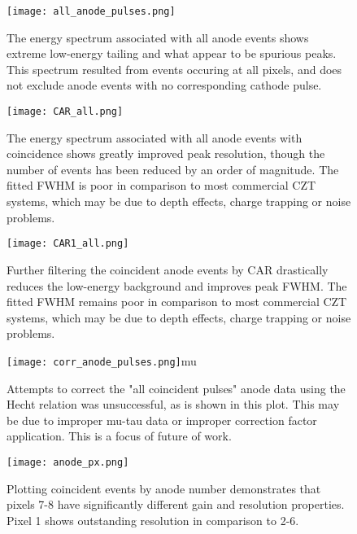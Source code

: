 \begin{figure}[h!]
\begin{center}
\texttt{[image: all\_anode\_pulses.png]}
\caption{The energy spectrum associated with all anode events shows extreme low-energy tailing and what appear to be spurious peaks. This spectrum resulted from events occuring at all pixels, and does not exclude anode events with no corresponding cathode pulse. }
\label{400}
\end{center}
\end{figure}


\begin{figure}[h!]
\begin{center}
\texttt{[image: CAR\_all.png]}
\caption{The energy spectrum associated with all anode events with coincidence shows greatly improved peak resolution, though the number of events has been reduced by an order of magnitude. The fitted FWHM is poor in comparison to most commercial CZT systems, which may be due to depth effects, charge trapping or noise problems.}
\label{400}
\end{center}
\end{figure}


\begin{figure}[h!]
\begin{center}
\texttt{[image: CAR1\_all.png]}
\caption{Further filtering the coincident anode events by CAR drastically reduces the low-energy background and improves peak FWHM. The fitted FWHM remains poor in comparison to most commercial CZT systems, which may be due to depth effects, charge trapping or noise problems.}
\label{400}
\end{center}
\end{figure}

\begin{figure}[h!]
\begin{center}
\texttt{[image: corr\_anode\_pulses.png]}mu
\caption{Attempts to correct the "all coincident pulses" anode data using the Hecht relation was unsuccessful, as is shown in this plot. This may be due to improper mu-tau data or improper correction factor application. This is a focus of future of work.}
\label{400}
\end{center}
\end{figure}

\begin{figure}[h!]
\begin{center}
\texttt{[image: anode\_px.png]}
\caption{Plotting coincident events by anode number demonstrates that pixels 7-8 have significantly different gain and resolution properties. Pixel 1 shows outstanding resolution in comparison to 2-6.}
\label{400}
\end{center}
\end{figure}

